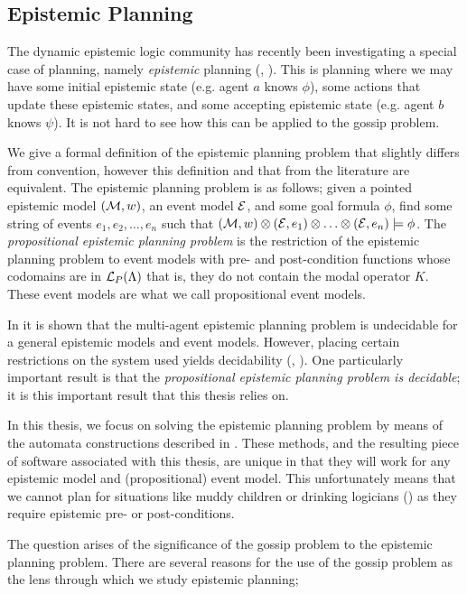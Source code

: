 \documentclass[ %
                    author={Leo Poulson},
                supervisor={Dr. Steven Ramsay},
                    degree={BSc},
                     title={Epistemic Planning for the Dynamic Gossip problem},
                  subtitle={},
                      year={2019} ]{dissertation}
\begin{document}
\subsection{Epistemic Planning}

The dynamic epistemic logic community has recently been investigating a special case
of planning, namely \emph{epistemic} planning (\cite{BolanderEP},
\cite{UndecidabilityEP}). This is planning where we may have some initial
epistemic state (e.g. agent $a$ knows $\phi$), some actions that update these
epistemic states, and some accepting epistemic state (e.g. agent $b$ knows
$\psi$). It is not hard to see how this can be applied to the gossip problem.

We give a formal definition of the epistemic planning problem that slightly
differs from convention, however this definition and that from the literature
are equivalent. The epistemic planning problem is as follows; given a pointed
epistemic model $(\mathcal{M}, w)$, an event model $\mathcal{E}$, and some goal formula
$\phi$, find some string of events ${e_1, e_2, \ldots, e_n}$ such that $(\mathcal{M},
w) \otimes (\mathcal{E}, e_1) \otimes \ldots \otimes (\mathcal{E}, e_n) \models \phi$. The
\emph{propositional epistemic planning problem} is the restriction of the
epistemic planning problem to event models with pre- and post-condition
functions whose codomains are in $\mathcal{L}_P(\Lambda)$ that is, they do not
contain the modal operator $K$. These event models are what we call
propositional event models.

In \cite{BolanderEP} it is shown that the multi-agent epistemic planning problem
is undecidable for a general epistemic models and event models. However, placing
certain restrictions on the system used yields decidability
(\cite{DecidabilityEp}, \cite{AutomataTechniques}). One particularly important
result is that the \emph{propositional epistemic planning problem is decidable};
it is this important result that this thesis relies on.

In this thesis, we focus on solving the epistemic planning problem by means of
the automata constructions described in \cite{AutomataTechniques}. These
methods, and the resulting piece of software associated with this thesis, are
unique in that they will work for any epistemic model and (propositional) event
model. This unfortunately means that we cannot plan for situations like muddy
children or drinking logicians (\cite{DEMO-S5}) as they require epistemic pre-
or post-conditions. 

The question arises of the significance of the gossip problem to the epistemic
planning problem. There are several reasons for the use of the gossip problem
as the lens through which we study epistemic planning; 
\end{document}
